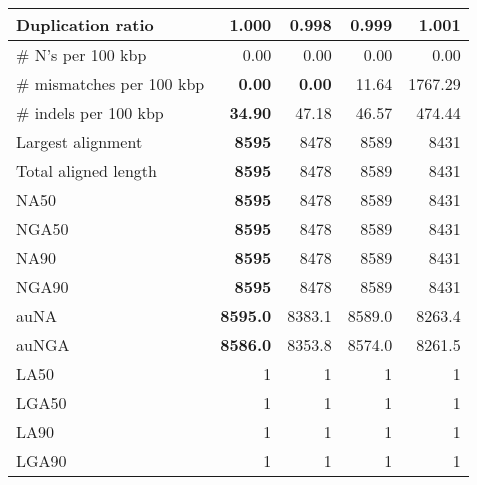 \documentclass[12pt,a4paper]{article}
\begin{document}
\begin{table}[ht]
\begin{center}
\begin{tabular}{|l*{4}{|r}|}
Duplication ratio & 1.000 & {\bf 0.998} & 0.999 & 1.001 \\ \hline
\# N's per 100 kbp & 0.00 & 0.00 & 0.00 & 0.00 \\ \hline
\# mismatches per 100 kbp & {\bf 0.00} & {\bf 0.00} & 11.64 & 1767.29 \\ \hline
\# indels per 100 kbp & {\bf 34.90} & 47.18 & 46.57 & 474.44 \\ \hline
Largest alignment & {\bf 8595} & 8478 & 8589 & 8431 \\ \hline
Total aligned length & {\bf 8595} & 8478 & 8589 & 8431 \\ \hline
NA50 & {\bf 8595} & 8478 & 8589 & 8431 \\ \hline
NGA50 & {\bf 8595} & 8478 & 8589 & 8431 \\ \hline
NA90 & {\bf 8595} & 8478 & 8589 & 8431 \\ \hline
NGA90 & {\bf 8595} & 8478 & 8589 & 8431 \\ \hline
auNA & {\bf 8595.0} & 8383.1 & 8589.0 & 8263.4 \\ \hline
auNGA & {\bf 8586.0} & 8353.8 & 8574.0 & 8261.5 \\ \hline
LA50 & 1 & 1 & 1 & 1 \\ \hline
LGA50 & 1 & 1 & 1 & 1 \\ \hline
LA90 & 1 & 1 & 1 & 1 \\ \hline
LGA90 & 1 & 1 & 1 & 1 \\ \hline
\end{tabular}
\end{center}
\end{table}
\end{document}
